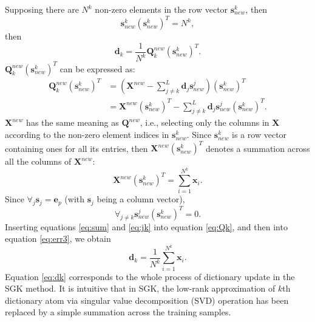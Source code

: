 Supposing there are $N^k$ non-zero elements in the row vector $\mathbf{s}_{new}^{k}$, then 
\begin{equation}
\label{eq:N}
\mathbf{s}_{new}^{k}(\mathbf{s}_{new}^{k})^T =N^k,
\end{equation}
then
\begin{equation}
\label{eq:err3}
\mathbf{d}_{k}=\frac{1}{N^k}\mathbf{Q}_{k}^{new}(\mathbf{s}_{new}^{k})^T.
\end{equation}
$\mathbf{Q}_{k}^{new}(\mathbf{s}_{new}^{k})^T$ can be expressed as:
\begin{equation}
\label{eq:Qk}
\begin{split}
\mathbf{Q}_{k}^{new}(\mathbf{s}_{new}^{k})^T & = \left( \mathbf{X}^{new}-\sum_{j\ne k}^{L} \mathbf{d}_{j}\mathbf{s}_{new}^{j} \right)(\mathbf{s}_{new}^{k})^T \\
&= \mathbf{X}^{new}(\mathbf{s}_{new}^{k})^T - \sum_{j\ne k}^{L} \mathbf{d}_{j}\mathbf{s}_{new}^{j}(\mathbf{s}_{new}^{k})^T.
\end{split}
\end{equation}
$\mathbf{X}^{new}$ has the same meaning as $\mathbf{Q}^{new}$, i.e., selecting only the columns in  $\mathbf{X}$ according to the non-zero element indices in $\mathbf{s}_{new}^k$. Since $\mathbf{s}_{new}^{k}$ is a row vector containing ones for all its entries, then $\mathbf{X}^{new}(\mathbf{s}_{new}^{k})^T$ denotes a summation across all the columns of $\mathbf{X}^{new}$:
\begin{equation}
\label{eq:sum}
 \mathbf{X}^{new}(\mathbf{s}_{new}^{k})^T = \sum_{i=1}^{N^k}\mathbf{x}_i.
\end{equation}
Since $\forall_{j} \mathbf{s}_j = \mathbf{e}_p$ (with $\mathbf{s}_j$ being a column vector), 
\begin{equation}
\label{eq:jk}
\forall_{j\ne k} \mathbf{s}_{new}^{j}(\mathbf{s}_{new}^{k})^T =0.
\end{equation}
Inserting equations \ref{eq:sum} and \ref{eq:jk} into equation \ref{eq:Qk}, and then into equation \ref{eq:err3}, we obtain
\begin{equation}
\label{eq:dk}
\mathbf{d}_{k}=\frac{1}{N^k}\sum_{i=1}^{N^k}\mathbf{x}_i.
\end{equation}
Equation \ref{eq:dk} corresponds to the whole process of dictionary update in the SGK method. It is intuitive that in SGK, the low-rank approximation of $k$th dictionary atom via singular value decomposition (SVD) operation has been replaced by a simple summation across the training samples.

